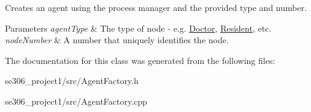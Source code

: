 Creates an agent using the process manager and the provided type and number. 


\begin{DoxyParams}{Parameters}
{\em agent\-Type} & The type of node -\/ e.\-g. \hyperlink{classDoctor}{Doctor}, \hyperlink{classResident}{Resident}, etc. \\
\hline
{\em node\-Number} & A number that uniquely identifies the node. \\
\hline
\end{DoxyParams}


The documentation for this class was generated from the following files\-:\begin{DoxyCompactItemize}
\item 
se306\-\_\-project1/src/Agent\-Factory.\-h\item 
se306\-\_\-project1/src/Agent\-Factory.\-cpp\end{DoxyCompactItemize}
